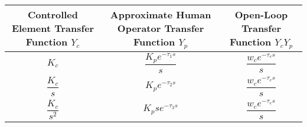 \begin{tabular}{*{3}{c}}
    \toprule
    \thead{Controlled Element                                                            \\ Transfer Function\\ $Y_c$} & \thead{Approximate Human Operator\\ Transfer Function\\ $Y_p$} & \thead{Open-Loop\\ Transfer Function\\ $Y_c Y_p$} \\
    \midrule
    $K_c$              & $\dfrac{K_p e^{-\tau_1 s}}{s}$ & $\dfrac{w_c e^{-\tau_e s}}{s}$ \\
    $\dfrac{K_c}{s}$   & $K_p e^{-\tau_2 s}$            & $\dfrac{w_c e^{-\tau_e s}}{s}$ \\
    $\dfrac{K_c}{s^2}$ & $K_p s e^{-\tau_3 s}$          & $\dfrac{w_c e^{-\tau_e s}}{s}$ \\
    \bottomrule
\end{tabular}
